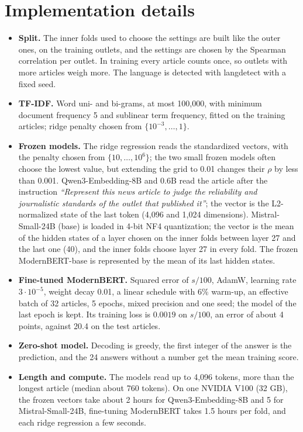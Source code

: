 \documentclass[11pt,a4paper]{article}
\begin{document}
\section{Implementation details}\label{app:impl}
\begin{itemize}
  \item \textbf{Split.} The inner folds used to choose the settings are built like the outer ones, on the training
        outlets, and the settings are chosen by the Spearman correlation per outlet. In training every article counts
        once, so outlets with more articles weigh more. The language is detected with langdetect with a fixed seed.
  \item \textbf{TF-IDF.} Word uni- and bi-grams, at most 100,000, with minimum document frequency 5 and sublinear term
        frequency, fitted on the training articles; ridge penalty chosen from $\{10^{-3}, \ldots, 1\}$.
  \item \textbf{Frozen models.} The ridge regression reads the standardized vectors, with the penalty chosen from $\{10,
        \ldots, 10^6\}$; the two small frozen models often choose the lowest value, but extending the grid to 0.01
        changes their $\rho$ by less than 0.001. Qwen3-Embedding-8B and 0.6B read the article after the instruction
        \emph{``Represent this news article to judge the reliability and journalistic standards of the outlet that
        published it''}; the vector is the L2-normalized state of the last token (4,096 and 1,024 dimensions).
        Mistral-Small-24B (base) is loaded in 4-bit NF4 quantization; the vector is the mean of the hidden states of a
        layer chosen on the inner folds between layer 27 and the last one (40), and the inner folds choose layer 27 in
        every fold. The frozen ModernBERT-base is represented by the mean of its last hidden states.
  \item \textbf{Fine-tuned ModernBERT.} Squared error of $s/100$, AdamW, learning rate $3 \cdot 10^{-5}$, weight decay
        0.01, a linear schedule with 6\% warm-up, an effective batch of 32 articles, 5 epochs, mixed precision and one
        seed; the model of the last epoch is kept. Its training loss is $0.0019$ on $s/100$, an error of about 4 points,
        against 20.4 on the test articles.
  \item \textbf{Zero-shot model.} Decoding is greedy, the first integer of the answer is the prediction, and the 24
        answers without a number get the mean training score.
  \item \textbf{Length and compute.} The models read up to 4,096 tokens, more than the longest article (median about 760
        tokens). On one NVIDIA V100 (32 GB), the frozen vectors take about 2 hours for Qwen3-Embedding-8B and 5 for
        Mistral-Small-24B, fine-tuning ModernBERT takes 1.5 hours per fold, and each ridge regression a few seconds.
\end{itemize}
\end{document}

